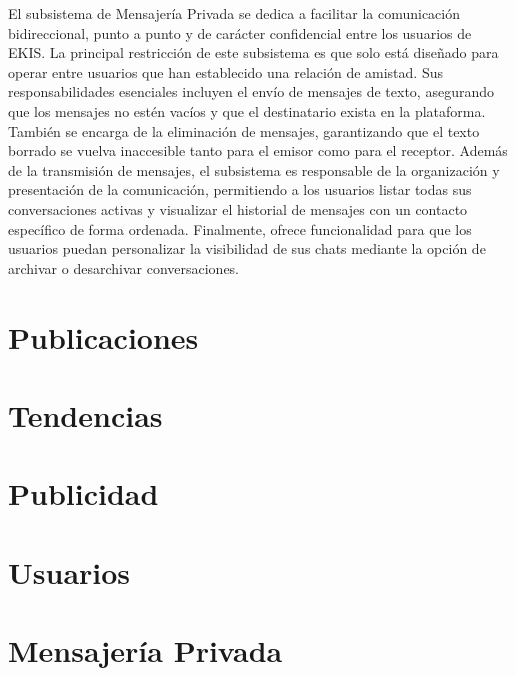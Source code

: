 \documentclass[twoside,openright,titlepage,numbers=noenddot,headinclude,footinclude=true,
cleardoublepage=empty,abstractoff,BCOR=5mm,paper=a4,fontsize=12pt,main=spanish,pdfstartpage=1]{scrreprt}
\theoremstyle{plain}
\begin{document}
\begin{itemize}
\begin{enumerate}
      El subsistema de Mensajería Privada se dedica a facilitar la comunicación bidireccional, punto a punto y de carácter confidencial entre los usuarios de EKIS. La principal restricción de este subsistema es que solo está diseñado para operar entre usuarios que han establecido una relación de amistad. Sus responsabilidades esenciales incluyen el envío de mensajes de texto, asegurando que los mensajes no estén vacíos y que el destinatario exista en la plataforma. También se encarga de la eliminación de mensajes, garantizando que el texto borrado se vuelva inaccesible tanto para el emisor como para el receptor. Además de la transmisión de mensajes, el subsistema es responsable de la organización y presentación de la comunicación, permitiendo a los usuarios listar todas sus conversaciones activas y visualizar el historial de mensajes con un contacto específico de forma ordenada. Finalmente, ofrece funcionalidad para que los usuarios puedan personalizar la visibilidad de sus chats mediante la opción de archivar o desarchivar conversaciones.\\
    \end{enumerate}

\end{itemize}


\chapter{Publicaciones}


\chapter{Tendencias}


\chapter{Publicidad}


\chapter{Usuarios}


\chapter{Mensajería Privada}

\end{document}
